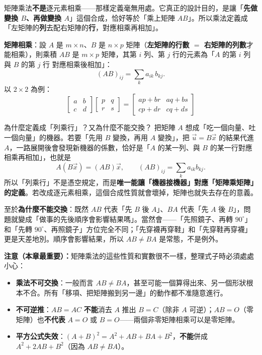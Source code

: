 \documentclass[11pt]{article}
\begin{document}
矩陣乘法\textbf{不是}逐元素相乘——那樣定義毫無用處。它真正的設計目的，是讓「\textbf{先做變換 $B$、再做變換 $A$}」這個合成，恰好等於「乘上矩陣 $AB$」。所以乘法定義成「左矩陣的\textbf{列}去配右矩陣的\textbf{行}，對應相乘再相加」。

\textbf{矩陣相乘}：設 $A$ 是 $m\times n$、$B$ 是 $n\times p$ 矩陣（\textbf{左矩陣的行數 $=$ 右矩陣的列數}才能相乘），則乘積 $AB$ 是 $m\times p$ 矩陣，其第 $i$ 列、第 $j$ 行的元素為「$A$ 的第 $i$ 列 與 $B$ 的第 $j$ 行 對應相乘後相加」：
$$(AB)_{ij}=\sum_{k} a_{ik}\,b_{kj}.$$
以 $2\times2$ 為例：
$$\boxed{\;\begin{bmatrix} a & b\\ c & d \end{bmatrix}\begin{bmatrix} p & q\\ r & s \end{bmatrix}=\begin{bmatrix} ap+br & aq+bs\\ cp+dr & cq+ds \end{bmatrix}\;}$$

\begin{補充框}{為什麼定義成「列乘行」？又為什麼不能交換？}
把矩陣 $A$ 想成「吃一個向量、吐一個向量」的機器。若要「先用 $B$ 變換，再用 $A$ 變換」，把 $\vec u=B\vec x$ 的結果代進 $A$，一路展開後會發現新機器的係數，恰好是「$A$ 的某一列、與 $B$ 的某一行對應相乘再相加」，也就是
$$A(B\vec x)=(AB)\vec x,\qquad (AB)_{ij}=\sum_k a_{ik}b_{kj}.$$
所以「列乘行」不是憑空規定，而是\textbf{唯一能讓「機器接機器」對應「矩陣乘矩陣」的定義}。若改成逐元素相乘，這個合成性質就會壞掉，矩陣也就失去存在的意義。

至於\textbf{為什麼不能交換}：既然 $AB$ 代表「先 $B$ 後 $A$」、$BA$ 代表「先 $A$ 後 $B$」，問題就變成「做事的先後順序會影響結果嗎」。當然會——「先照鏡子、再轉 $90^\circ$」和「先轉 $90^\circ$、再照鏡子」方位完全不同；「先穿襪再穿鞋」和「先穿鞋再穿襪」更是天差地別。順序會影響結果，所以 $AB\ne BA$ 是常態，不是例外。
\end{補充框}

\textbf{注意（本章最重要）：}矩陣乘法的這些性質和實數很不一樣，整理式子時必須處處小心：

\begin{itemize}\setlength{\itemsep}{1pt}
\item \textbf{乘法不可交換}：一般而言 $AB\ne BA$，甚至可能一個算得出來、另一個形狀根本不合。所有「移項、把矩陣搬到另一邊」的動作都不准隨意進行。
\item \textbf{不可逆推}：$AB=AC$ \textbf{不能}消去 $A$ 推出 $B=C$（除非 $A$ 可逆）；$AB=O$（零矩陣）也\textbf{不代表} $A=O$ 或 $B=O$——兩個非零矩陣相乘可以是零矩陣。
\item \textbf{平方公式失效}：$(A+B)^2=A^2+AB+BA+B^2$，\textbf{不能}併成 $A^2+2AB+B^2$（因為 $AB\ne BA$）。
\end{itemize}
\end{document}
